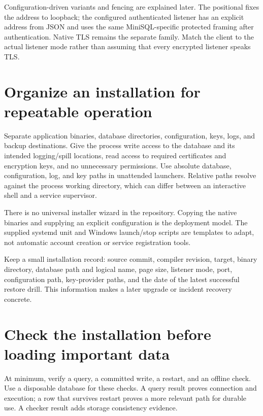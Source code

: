 Configuration-driven variants and fencing are explained later. The positional
 fixes the address to loopback; the configured
authenticated listener has an explicit address from JSON and uses the same
MiniSQL-specific protected framing after authentication. Native TLS remains
the separate  family. Match the client to the actual listener
mode rather than assuming that every encrypted listener speaks TLS.

\section{Organize an installation for repeatable operation}

Separate application binaries, database directories, configuration, keys,
logs, and backup destinations. Give the process write access to the database
and its intended logging/spill locations, read access to required certificates
and encryption keys, and no unnecessary permissions. Use absolute database,
configuration, log, and key paths in unattended launchers. Relative paths
resolve against the process working directory, which can differ between an
interactive shell and a service supervisor.

There is no universal installer wizard in the repository. Copying the native
binaries and supplying an explicit configuration is the deployment model.
The supplied systemd unit and Windows launch/stop scripts are templates to
adapt, not automatic account creation or service registration tools.

Keep a small installation record: source commit, compiler revision, target,
binary directory, database path and logical name, page size, listener mode,
port, configuration path, key-provider paths, and the date of the latest
successful restore drill. This information makes a later upgrade or incident
recovery concrete.

\section{Check the installation before loading important data}

At minimum, verify a query, a committed write, a restart, and an offline check.
Use a disposable database for these checks. A query result proves connection
and execution; a row that survives restart proves a more relevant path for
durable use. A checker result adds storage consistency evidence.

